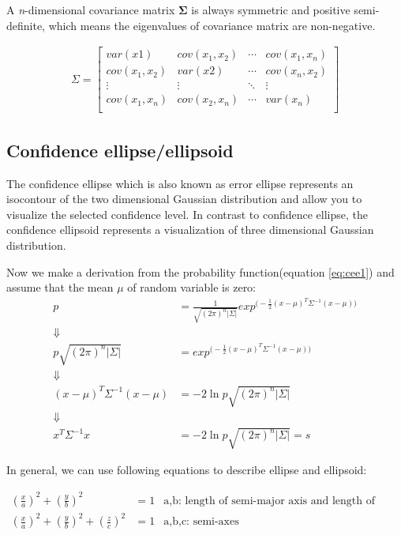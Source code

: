A \textit{n}-dimensional covariance matrix $\boldsymbol{\Sigma}$ is always symmetric and positive semi-definite, which means the eigenvalues of covariance matrix are non-negative.

\begin{align*}
\Sigma =   \begin{bmatrix} var(x1) & cov(x_1,x_2) & \cdots & cov(x_1,x_n) \\
                 cov(x_1,x_2) & var(x2) & \cdots & cov(x_n,x_2) \\
                 \vdots  & \vdots  & \ddots & \vdots  \\
                 cov(x_1,x_n) & cov(x_2,x_n) & \cdots & var(x_n) \\ \end{bmatrix} 
\end{align*}

\subsection{Confidence ellipse/ellipsoid}
The confidence ellipse which is also known as error ellipse represents an isocontour of the two dimensional Gaussian distribution and allow you to visualize the selected confidence level. In contrast to confidence ellipse, the confidence ellipsoid represents a visualization of three dimensional Gaussian distribution. 

Now we make a derivation from the probability function(equation \ref{eq:cee1}) and assume that the mean $\mu$ of random variable is zero:
\begin{align*}
p &= \frac{1}{\sqrt{( 2\pi)^n|\Sigma|}}exp^{\big(-\frac{1}{2}(x - \mu)^T \Sigma^{-1} (x - \mu) \big)}\\
\Downarrow \\
p \sqrt{( 2\pi)^n|\Sigma|} &= exp^{\big(-\frac{1}{2}(x - \mu)^T \Sigma^{-1} (x - \mu) \big)}\\
\Downarrow \\
(x - \mu)^T \Sigma^{-1} (x - \mu) &= -2 \ln{p \sqrt{( 2\pi)^n|\Sigma|}}\\
\Downarrow \\
x^T \Sigma^{-1} x &= -2 \ln{p \sqrt{( 2\pi)^n|\Sigma|}} = s
\end{align*}

In general, we can use following equations to describe ellipse and ellipsoid:

\begin{align*}
(\frac{x}{a})^2 + (\frac{y}{b})^2 &= 1 & \text{a,b: length of semi-major axis and length of semi-minor axis}\\
(\frac{x}{a})^2 + (\frac{y}{b})^2 + (\frac{z}{c})^2 &= 1 & \text{a,b,c: semi-axes}
\end{align*}

